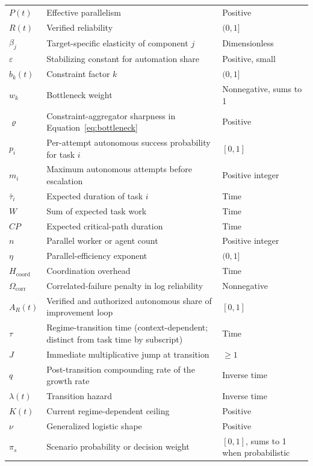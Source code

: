 \begin{longtable}{>{\raggedright\arraybackslash}p{}>{\raggedright\arraybackslash}p{}>{\raggedright\arraybackslash}p{}}
$P(t)$ & Effective parallelism & Positive\\
$R(t)$ & Verified reliability & $(0,1]$\\
$\beta_j$ & Target-specific elasticity of component $j$ & Dimensionless\\
$\varepsilon$ & Stabilizing constant for automation share & Positive, small\\
$b_k(t)$ & Constraint factor $k$ & $(0,1]$\\
$w_k$ & Bottleneck weight & Nonnegative, sums to 1\\
$\varrho$ & Constraint-aggregator sharpness in Equation~\eqref{eq:bottleneck} & Positive\\
$p_i$ & Per-attempt autonomous success probability for task $i$ & $[0,1]$\\
$m_i$ & Maximum autonomous attempts before escalation & Positive integer\\
$\bar\tau_i$ & Expected duration of task $i$ & Time\\
$W$ & Sum of expected task work & Time\\
$CP$ & Expected critical-path duration & Time\\
$n$ & Parallel worker or agent count & Positive integer\\
$\eta$ & Parallel-efficiency exponent & $(0,1]$\\
$H_{\mathrm{coord}}$ & Coordination overhead & Time\\
$\Omega_{\mathrm{corr}}$ & Correlated-failure penalty in log reliability & Nonnegative\\
$A_R(t)$ & Verified and authorized autonomous share of improvement loop & $[0,1]$\\
$\tau$ & Regime-transition time (context-dependent; distinct from task time by subscript) & Time\\
$J$ & Immediate multiplicative jump at transition & $\ge1$\\
$q$ & Post-transition compounding rate of the growth rate & Inverse time\\
$\lambda(t)$ & Transition hazard & Inverse time\\
$K(t)$ & Current regime-dependent ceiling & Positive\\
$\nu$ & Generalized logistic shape & Positive\\
$\pi_s$ & Scenario probability or decision weight & $[0,1]$, sums to 1 when probabilistic\\
\bottomrule
\end{longtable}
\normalsize
